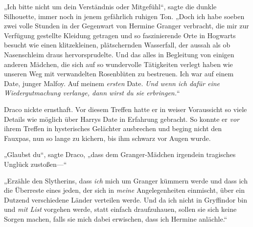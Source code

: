 „Ich bitte nicht um dein Verständnis oder Mitgefühl“, sagte die dunkle Silhouette, immer noch in jenem gefährlich ruhigen Ton. „Doch ich habe soeben zwei volle Stunden in der Gegenwart von Hermine Granger verbracht, die mir zur Verfügung gestellte Kleidung getragen und so faszinierende Orte in Hogwarts besucht wie einen klitzekleinen, plätschernden Wasserfall, der aussah als ob Nasenschleim draus hervorsprudelte. Und das alles in Begleitung von einigen anderen Mädchen, die sich auf so wundervolle Tätigkeiten verlegt haben wie unseren Weg mit verwandelten Rosenblüten zu bestreuen. Ich war auf einem Date, junger Malfoy. Auf meinem \emph{ersten} Date. \emph{Und wenn ich dafür eine Wiedergutmachung verlange, dann wirst du sie erbringen.}“

Draco nickte ernsthaft. Vor diesem Treffen hatte er in weiser Voraussicht so viele Details wie möglich über Harrys Date in Erfahrung gebracht. So konnte er \emph{vor} ihrem Treffen in hysterisches Gelächter ausbrechen und beging nicht den Fauxpas, nun so lange zu kichern, bis ihm schwarz vor Augen wurde.

„Glaubst du“, sagte Draco, „dass dem Granger-Mädchen irgendein tragisches Unglück zustoßen—“

„Erzähle den Slytherins, dass \emph{ich} mich um Granger kümmern werde und dass ich die Überreste eines jeden, der sich in \emph{meine} Angelegenheiten einmischt, über ein Dutzend verschiedene Länder verteilen werde. Und da ich nicht in Gryffindor bin und \emph{mit List} vorgehen werde, statt einfach draufzuhauen, sollen sie sich keine Sorgen machen, falls sie mich dabei erwischen, dass ich Hermine anlächle.“

